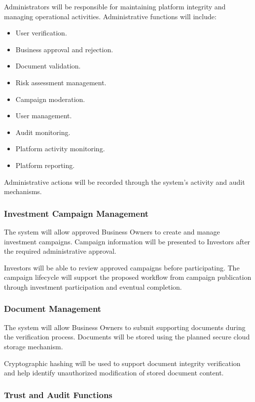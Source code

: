 Administrators will be responsible for maintaining platform integrity and
managing operational activities. Administrative functions will include:

\begin{itemize}
    \item User verification.
    \item Business approval and rejection.
    \item Document validation.
    \item Risk assessment management.
    \item Campaign moderation.
    \item User management.
    \item Audit monitoring.
    \item Platform activity monitoring.
    \item Platform reporting.
\end{itemize}

Administrative actions will be recorded through the system's activity and
audit mechanisms.


\subsubsection{Investment Campaign Management}

The system will allow approved Business Owners to create and manage
investment campaigns. Campaign information will be presented to Investors
after the required administrative approval.

Investors will be able to review approved campaigns before participating.
The campaign lifecycle will support the proposed workflow from campaign
publication through investment participation and eventual completion.


\subsubsection{Document Management}

The system will allow Business Owners to submit supporting documents during
the verification process. Documents will be stored using the planned secure
cloud storage mechanism.

Cryptographic hashing will be used to support document integrity
verification and help identify unauthorized modification of stored
document
content.


\subsubsection{Trust and Audit Functions}

